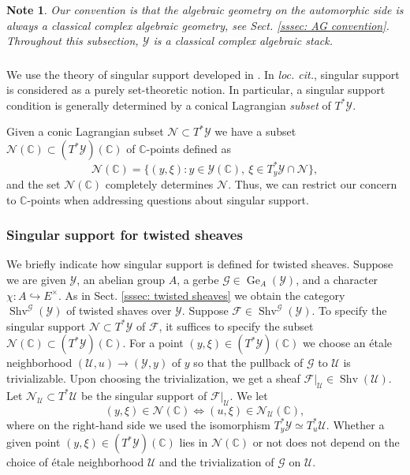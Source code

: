 \documentclass[10pt]{amsart}
\newcommand{\sssec}{\subsubsection}
\newtheorem{note}[subsubsection]{Note}
\theoremstyle{remark}
\newcommand{\mc}[1]{\mathcal{#1}}
\newcommand{\C}{\mathbb{C}}
\newcommand{\on}{\operatorname}
\newcommand{\cF}{\mathcal{F}}
\newcommand{\cG}{\mathcal{G}}
\newcommand{\cN}{\mathcal{N}}
\newcommand{\cY}{\mathcal{Y}}
\newcommand{\Shv}{\on{Shv}}
\begin{document}
\begin{note}
    Our convention is that the algebraic geometry on the automorphic side is always a classical complex algebraic geometry, see Sect. \ref{sssec: AG convention}. Throughout this subsection, $\cY$ is a classical complex algebraic stack.
\end{note}

\sssec{}\label{sssec: singsupp review}
We use the theory of singular support developed in \cite[Sect. A.3]{GKRV}. In \emph{loc. cit.}, singular support is considered as a purely set-theoretic notion. In particular, a singular support condition is generally determined by a conical Lagrangian \emph{subset} of $T^*\cY$.
 \medskip
 
 Given a conic Lagrangian subset $\cN\subset T^*\cY$ we have a subset $\cN(\C)\subset (T^*\cY)(\C)$ of $\C$-points defined as
 \[\cN(\C)=\{(y,\xi): y\in \cY(\C), \ \xi\in T^*_y\cY\cap \cN\},\]
 and the set $\cN(\C)$ completely determines $\cN$. Thus, we can restrict our concern to $\C$-points when addressing questions about singular support.


\sssec{Singular support for twisted sheaves}
We briefly indicate how singular support is defined for twisted sheaves.
Suppose we are given $\cY$, an abelian group $A$, a gerbe $\cG\in\on{Ge}_A(\cY)$, and a character $\chi:A\hookrightarrow E^{\times}$. As in Sect. \ref{sssec: twisted sheaves} we obtain the category $\Shv^{\cG}(\cY)$ of twisted shaves over $\cY$. Suppose $\cF\in \Shv^{\cG}(\cY)$. To specify the singular support $\cN\subset T^*\cY$ of $\cF$, it suffices to specify the subset $\cN(\C)\subset (T^*\cY)(\C)$. For a point $(y,\xi)\in (T^*\cY)(\C)$ we choose an \'etale neighborhood $(\mc{U},u)\rightarrow (\cY,y)$ of $y$ so that the pullback of $\cG$ to $\mc{U}$ is trivializable. Upon choosing the trivialization, we get a sheaf $\cF|_{\mc{U}}\in \Shv(\mc{U})$. Let $\cN_{\mc{U}}\subset T^*\mc{U}$ be the singular support of $\cF|_{\mc{U}}$. We let
\[(y,\xi)\in \cN(\C) \iff (u,\xi)\in \cN_{\mc{U}}(\C),\]
where on the right-hand side we used the isomorphism $T^*_y\cY\simeq T^*_u\mc{U}$. Whether a given point $(y,\xi)\in (T^*\cY)(\C)$ lies in $\cN(\C)$ or not does not depend on the choice of \'etale neighborhood $\mc{U}$ and the trivialization of $\cG$ on $\mc{U}$.
\end{document}
